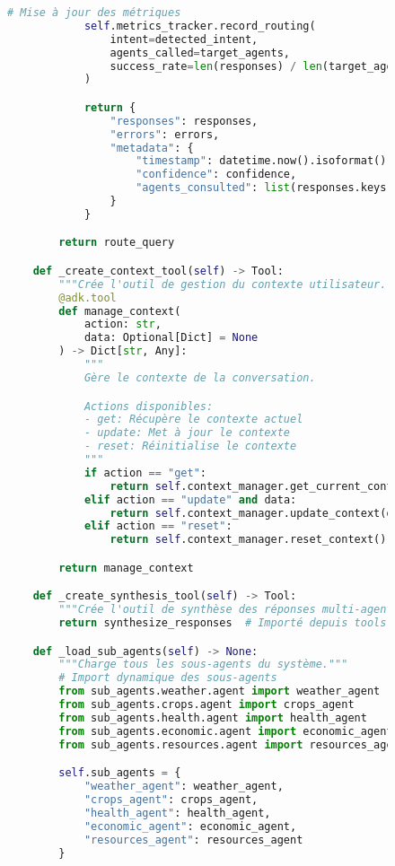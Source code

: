 \begin{figure}[H]
\begin{lstlisting}[language=Python, caption=Structure complète de l'agent principal]
            # Mise à jour des métriques
            self.metrics_tracker.record_routing(
                intent=detected_intent,
                agents_called=target_agents,
                success_rate=len(responses) / len(target_agents) if target_agents else 0
            )

            return {
                "responses": responses,
                "errors": errors,
                "metadata": {
                    "timestamp": datetime.now().isoformat(),
                    "confidence": confidence,
                    "agents_consulted": list(responses.keys())
                }
            }

        return route_query

    def _create_context_tool(self) -> Tool:
        """Crée l'outil de gestion du contexte utilisateur."""
        @adk.tool
        def manage_context(
            action: str,
            data: Optional[Dict] = None
        ) -> Dict[str, Any]:
            """
            Gère le contexte de la conversation.

            Actions disponibles:
            - get: Récupère le contexte actuel
            - update: Met à jour le contexte
            - reset: Réinitialise le contexte
            """
            if action == "get":
                return self.context_manager.get_current_context()
            elif action == "update" and data:
                return self.context_manager.update_context(data)
            elif action == "reset":
                return self.context_manager.reset_context()

        return manage_context

    def _create_synthesis_tool(self) -> Tool:
        """Crée l'outil de synthèse des réponses multi-agents."""
        return synthesize_responses  # Importé depuis tools.py

    def _load_sub_agents(self) -> None:
        """Charge tous les sous-agents du système."""
        # Import dynamique des sous-agents
        from sub_agents.weather.agent import weather_agent
        from sub_agents.crops.agent import crops_agent
        from sub_agents.health.agent import health_agent
        from sub_agents.economic.agent import economic_agent
        from sub_agents.resources.agent import resources_agent

        self.sub_agents = {
            "weather_agent": weather_agent,
            "crops_agent": crops_agent,
            "health_agent": health_agent,
            "economic_agent": economic_agent,
            "resources_agent": resources_agent
        }


\end{lstlisting}
\end{figure}
